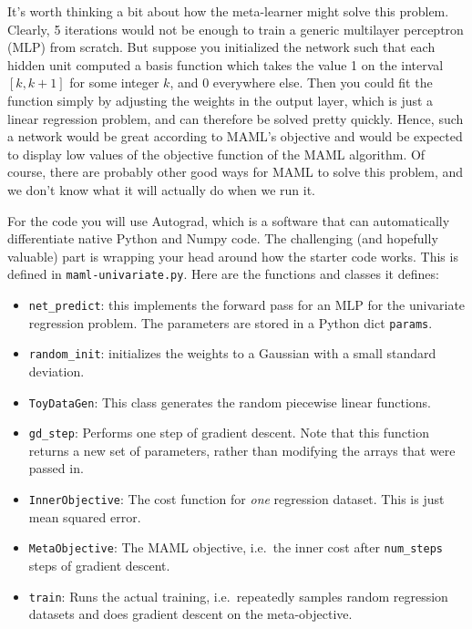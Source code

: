 \documentclass[11pt]{article}
\begin{document}
\begin{enumerate}
It's worth thinking a bit about how the meta-learner might solve this problem. Clearly, 5 iterations would not be enough to train a generic multilayer perceptron (MLP) from scratch. But suppose you initialized the network such that each hidden unit computed a basis function which takes the value 1 on the interval $[k, k+1]$ for some integer $k$, and 0 everywhere else. Then you could fit the function simply by adjusting the weights in the output layer, which is just a linear regression problem, and can therefore be solved pretty quickly. Hence, such a network would be great according to MAML's objective and would be expected to display low values of the objective function of the MAML algorithm. Of course, there are probably other good ways for MAML to solve this problem, and we don't know what it will actually do when we run it.

For the code you will use Autograd, which is a software that can automatically differentiate native Python and Numpy code. The challenging (and hopefully valuable) part is wrapping your head around how the starter code works. This is defined in \verb+maml-univariate.py+. Here are the functions and classes it defines:
\begin{itemize}
  \item \verb+net_predict+: this implements the forward pass for an MLP for the univariate regression problem. The parameters are stored in a Python dict \verb+params+.
  \item \verb+random_init+: initializes the weights to a Gaussian with a small standard deviation.
  \item \verb+ToyDataGen+: This class generates the random piecewise linear functions.
  \item \verb+gd_step+: Performs one step of gradient descent. Note that this function returns a new set of parameters, rather than modifying the arrays that were passed in.
  \item \verb+InnerObjective+: The cost function for \emph{one} regression dataset. This is just mean squared error.
  \item \verb+MetaObjective+: The MAML objective, i.e.~the inner cost after \verb+num_steps+ steps of gradient descent.
  \item \verb+train+: Runs the actual training, i.e.~repeatedly samples random regression datasets and does gradient descent on the meta-objective.
\end{itemize}


\end{enumerate}
\end{document}
